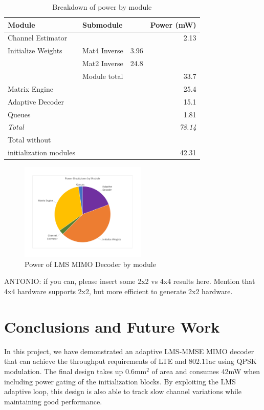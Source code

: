 \documentclass[journal]{IEEEtran}
\begin{document}
\begin{table}[!h]
\caption{Breakdown of power by module}
\label{power_breakdown_table}
\centering
\begin{tabular}{l l l r}
\hline
Module & Submodule & & Power (mW) \\
\hline
Channel Estimator & & & 2.13 \\
Initialize Weights & Mat4 Inverse & 3.96 & \\
 & Mat2 Inverse & 24.8 & \\
 & Module total & & 33.7 \\
Matrix Engine & & & 25.4 \\
Adaptive Decoder & & & 15.1 \\
Queues & & & 1.81 \\
\hline
\em{Total} & & & \em{78.14} \\
Total without & & & \\
initialization modules & & & 42.31 \\
\hline
\end{tabular}
\end{table}

\begin{figure}[!h]
\centering
\includegraphics*[width=6cm, viewport = 90 100 660 540]{images/power_breakdown_module.pdf}
\caption{Power of LMS MIMO Decoder by module}
\label{power_breakdown_module}
\end{figure}

ANTONIO: if you can, please insert some 2x2 vs 4x4 results here. Mention that 4x4 hardware supports 2x2, but more efficient to generate 2x2 hardware.


\section{Conclusions and Future Work}

In this project, we have demonstrated an adaptive LMS-MMSE MIMO decoder that can achieve the throughput requirements of LTE and 802.11ac using QPSK modulation. The final design takes up 0.6mm$^2$ of area and consumes 42mW when including power gating of the initialization blocks. By exploiting the LMS adaptive loop, this design is also able to track slow channel variations while maintaining good performance.
\end{document}
